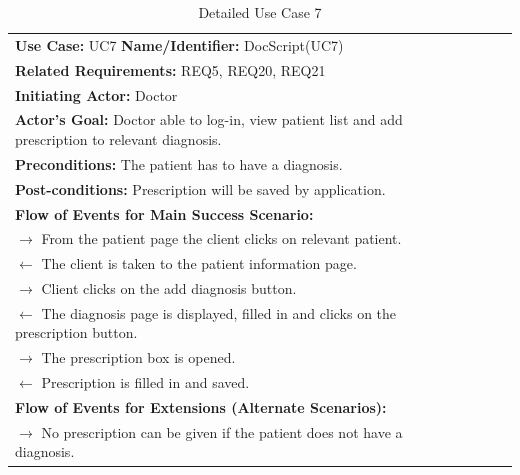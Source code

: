\documentclass[a4paper]{article}
\begin{document}
\FloatBarrier

\begin{table}[h!]
\centering
\caption*{Detailed Use Case 7}
\label{DetailedUC2}
\begin{tabular}{|c|llll}
\cline{1-1}

\multicolumn{1}{|l|}{\textbf{Use Case:} UC7 \textbf{Name/Identifier:} DocScript(UC7)} &  &  &  &  \\ \cline{1-1}

\multicolumn{1}{|l|}{\textbf{Related Requirements:} REQ5, REQ20, REQ21} &  &  &  &  \\

\multicolumn{1}{|l|}{\textbf{Initiating Actor:} Doctor} &  &  &  &  \\

\multicolumn{1}{|l|}{\textbf{Actor’s Goal:} Doctor able to log-in, view patient list and add prescription to relevant diagnosis.} &  &  &  &  \\

\multicolumn{1}{|l|}{\textbf{Preconditions:} The patient has to have a diagnosis.} &  &  &  &  \\

\multicolumn{1}{|l|}{\textbf{Post-conditions:} Prescription will be saved by application.} &  &  &  &  \\

\multicolumn{1}{|l|}{\textbf{Flow of Events for Main Success Scenario:}} &  &  &  &  \\

\multicolumn{1}{|l|}{ $ \rightarrow $ From the patient page the client clicks on relevant patient.} &  &  &  &  \\

\multicolumn{1}{|l|}{ $ \leftarrow $ The client is taken to the patient information page.} &  &  &  &  \\

\multicolumn{1}{|l|}{ $ \rightarrow $ Client clicks on the add diagnosis button.} &  &  &  &  \\

\multicolumn{1}{|l|}{ $ \leftarrow $ The diagnosis page is displayed, filled in and clicks on the prescription button.} &  &  &  &  \\

\multicolumn{1}{|l|}{ $ \rightarrow $ The prescription box is opened.} &  &  &  &  \\

\multicolumn{1}{|l|}{ $ \leftarrow $ Prescription is filled in and saved.} &  &  &  &  \\

\multicolumn{1}{|l|}{\textbf{Flow of Events for Extensions (Alternate Scenarios):}} &  &  &  &  \\

\multicolumn{1}{|l|}{ $ \rightarrow $ No prescription can be given if the patient does not have a diagnosis.} &  &  &  &  \\ \cline{1-1}

\end{tabular}
\end{table}
\end{document}
